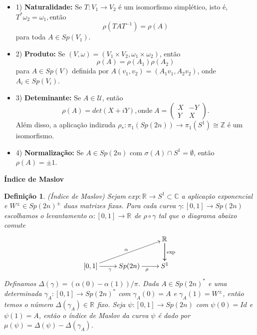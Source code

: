 \documentclass{beamer}
\newcommand{\titulo}[1]{\centering \textbf{#1}}
\newtheorem{definicao}[teorema]{Definição}
\newcommand{\circulo}{S^{1}}
\newcommand{\grupofundamental}[1]{\pi_{1}(#1)}
\newcommand{\gruposimpletico}[1]{Sp(#1)}
\newcommand{\inteiros}{\mathbb{Z}}
\newcommand{\matrizSimpleticaOrtogonal}{\mathcal{U}}
\newcommand{\real}[1]{\mathbb{R}^{#1}}
\begin{document}
\begin{frame}
	\begin{itemize}
			\item 1) \textbf{Naturalidade:}  Se $T:V_{1} \to V_{2}$ é um isomorfismo simplético, isto é, $T^{*}\omega_{2} = \omega_{1}, $então 
			$$
			\rho(TAT^{-1}) = \rho(A)
			$$
			para toda $A\in \gruposimpletico{V_{1}}$.
			
			\item 2) \textbf{Produto:} Se $(V,\omega) = (V_{1}\times V_{2},\omega_{1}\times \omega_{2})$, então
			$$
			\rho(A) = \rho(A_{1})\rho(A_{2})
			$$
			para $A\in \gruposimpletico{V}$ definida por $A(v_{1}, v_{2})=(A_{1}v_{1}, A_{2}v_{2})$, onde $A_{i} \in \gruposimpletico{V_{i}}$.
			
			\item 3) \textbf{Deteminante:} Se $A\in \matrizSimpleticaOrtogonal$, então 
			$$
			\rho(A) = det(X+iY), \text{onde} \;	
			A=\left(
			\begin{array}{cc}
			X & -Y					\\
			Y & X
			\end{array}
			\right).
			$$
			Além disso, a aplicação indizuda $\rho_{*}: \grupofundamental{\gruposimpletico{2n}} \to \grupofundamental{\circulo} \cong \inteiros$ é um isomorfismo.
			
			\item 4) \textbf{Normalização:} Se $A \in \gruposimpletico{2n}$ com $\sigma(A)\cap \circulo = \emptyset$, então $\rho(A) = \pm 1$.
		
	\end{itemize}
\end{frame}

\begin{frame}
	\titulo{Índice de Maslov}
	\begin{definicao}
		(Índice de Maslov) Sejam $exp:\real{} \to \circulo \subset \mathbb{C}$ a aplicação exponencial e $W^{\pm} \in Sp(2n)^{\pm}$ duas matrizes fixas. Para cada curva $\gamma:[0,1] \to Sp(2n)$ escolhamos o levantamento $\alpha:[0,1] \to \real{}$ de $\rho\circ \gamma$ tal que o diagrama abaixo comute
		$$
		\xymatrix{
			& & \real{}\ar[d]\ar[d]^{\text{exp}}
			\\
			[0,1 ]\ar[urr]^{\alpha} \ar[r]_{\gamma} & Sp(2n) \ar[r]_{\rho} & S^{1}
		}
		$$	
		Definamos $\varDelta(\gamma) = (\alpha(0) - \alpha(1))/\pi$. Dada $A \in Sp(2n)^{*}$ e uma determinada $\gamma_{A}:[0,1] \to Sp(2n)^{*}$ com $\gamma_{A}(0) = A$ e $\gamma_{A}(1) = W^{\pm}$, então temos o número $\varDelta(\gamma_{A}) \in \real{}$ fixo.
		Seja $\psi:[0,1] \to Sp(2n)$ com $\psi(0)=Id$ e $\psi(1)=A$, então o índice de Maslov da curva $\psi$ é dado por $\mu(\psi) = \varDelta(\psi) - \varDelta(\gamma_{A})$.
	
	\end{definicao}
	
\end{frame}
\end{document}
